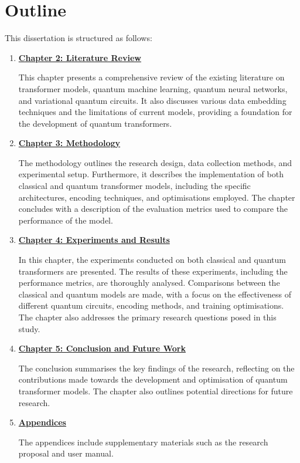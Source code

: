 \section{Outline}
\label{sec:outline}

This dissertation is structured as follows:

\begin{enumerate}
  \item \textbf{\hyperref[chap:literature]{Chapter 2: Literature Review}}

    This chapter presents a comprehensive review of the existing
    literature on transformer models, quantum machine learning,
    quantum neural networks, and variational quantum circuits. It
    also discusses various data embedding techniques and the
    limitations of current models, providing a foundation for the
    development of quantum transformers.

  \item \textbf{\hyperref[chap:methodology]{Chapter 3: Methodology}}

    The methodology outlines the research design, data collection
    methods, and experimental setup. Furthermore, it describes the
    implementation of both classical and quantum transformer models,
    including the specific architectures, encoding techniques, and
    optimisations employed. The chapter concludes with a description
    of the evaluation metrics used to compare the performance of the model.

  \item \textbf{\hyperref[chap:results]{Chapter 4: Experiments and Results}}

    In this chapter, the experiments conducted on both classical and
    quantum transformers are presented. The results of these
    experiments, including the performance metrics, are thoroughly
    analysed. Comparisons between the classical and quantum models
    are made, with a focus on the effectiveness of different quantum
    circuits, encoding methods, and training optimisations. The
    chapter also addresses the primary research questions posed in this study.

  \item \textbf{\hyperref[chap:conclusion]{Chapter 5: Conclusion and
    Future Work}}

    The conclusion summarises the key findings of the research,
    reflecting on the contributions made towards the development and
    optimisation of quantum transformer models. The
    chapter also outlines potential directions for future research.

  \item \textbf{\hyperref[apx:proposal]{Appendices}}

    The appendices include supplementary materials such as the
    research proposal and user manual.
\end{enumerate}
